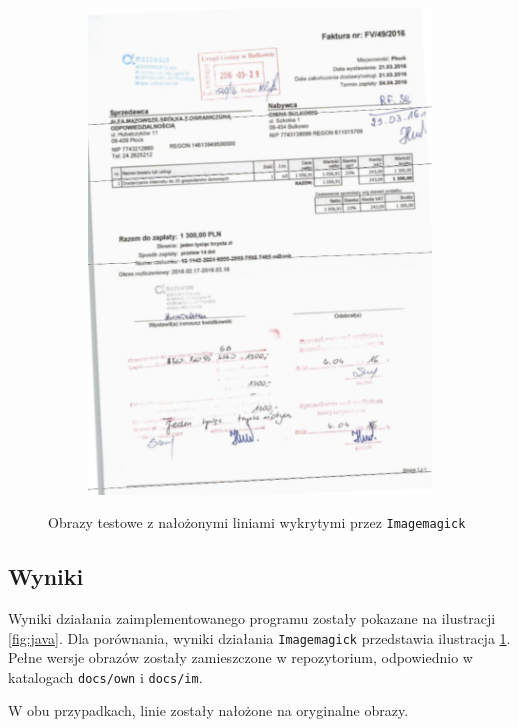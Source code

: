 \documentclass[10pt]{article} %
\begin{document}
\begin{figure}
\begin{subfigure}{\linewidth}
  \includegraphics[width=.33\linewidth]{im/ALFA-gauss.jpg}\hfill
  \end{subfigure}
  \caption{Obrazy testowe z nałożonymi liniami wykrytymi przez \texttt{Imagemagick}} \label{fig:im}
\end{figure}


\subsection{Wyniki}
Wyniki działania zaimplementowanego programu zostały pokazane na ilustracji \ref{fig:java}. Dla porównania, wyniki działania \texttt{Imagemagick} przedstawia ilustracja \ref{fig:im}. Pełne wersje obrazów zostały zamieszczone w repozytorium, odpowiednio w katalogach \texttt{docs/own} i \texttt{docs/im}.

W obu przypadkach, linie zostały nałożone na oryginalne obrazy. 
\end{document}
